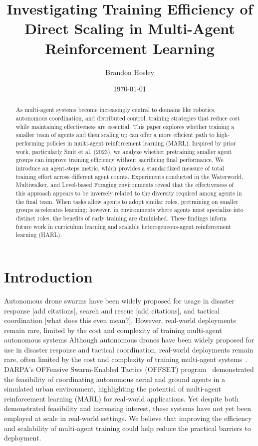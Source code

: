 \documentclass{article}
\title{Investigating Training Efficiency of Direct Scaling in Multi-Agent Reinforcement Learning}
\author{Brandon Hosley}
\date{\today}
\begin{document}
\maketitle

\begin{abstract}
    As multi-agent systems become increasingly central to domains like robotics, 
    autonomous coordination, and distributed control, training strategies 
    that reduce cost while maintaining effectiveness are essential. 
    This paper explores whether training a smaller team of agents and 
    then scaling up can offer a more efficient path to high-performing policies in 
    multi-agent reinforcement learning (MARL).
    Inspired by prior work, particularly Smit et al. (2023), 
    we analyze whether pretraining smaller agent groups can improve training efficiency 
    without sacrificing final performance. 
    We introduce an agent-steps metric, which provides a standardized measure of 
    total training effort across different agent counts.
    Experiments conducted in the Waterworld, Multiwalker, and Level-based Foraging environments 
    reveal that the effectiveness of this approach appears to be inversely related 
    to the diversity required among agents in the final team. 
    When tasks allow agents to adopt similar roles, 
    pretraining on smaller groups accelerates learning; 
    however, in environments where agents must specialize into distinct roles, 
    the benefits of early training are diminished. 
    These findings inform future work in curriculum learning and scalable 
    heterogeneous-agent reinforcement learning (HARL).
\end{abstract}

\section{Introduction}

Autonomous drone swarms have been widely proposed for usage in disaster
response [add citations], 
search and rescue [add citations], 
and tactical coordination [what does this even mean?]. 
However, real-world deployments remain rare, 
limited by the cost and complexity of training multi-agent autonomous systems
Although autonomous drones have been widely proposed for use in disaster response and 
tactical coordination, real-world deployments remain rare, often limited by the cost 
and complexity of training multi-agent systems~\cite{jin2025}. 
DARPA's OFFensive Swarm-Enabled Tactics (OFFSET) program~\cite{zotero-2835} 
demonstrated the feasibility of coordinating autonomous aerial and ground agents 
in a simulated urban environment, highlighting the potential of multi-agent reinforcement 
learning (MARL) for real-world applications. Yet despite both demonstrated feasibility and 
increasing interest, these systems have not yet been employed at scale in real-world settings. 
We believe that improving the efficiency and scalability of multi-agent training 
could help reduce the practical barriers to deployment. %
\end{document}
